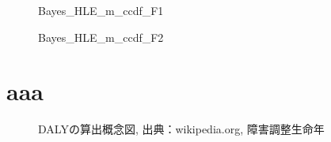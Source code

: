 \documentclass[a4j,11pt,mc, twocolumn]{jreport}
\begin{document}


	\begin{figure}[h!]
		\begin{center}
				\caption{Bayes\_HLE\_m\_ccdf\_F1}
		\end{center}
	\end{figure}



	\begin{figure}[h!]
		\begin{center}
				\caption{Bayes\_HLE\_m\_ccdf\_F2}
		\end{center}
	\end{figure}



	\section{aaa}
	\begin{figure}[h!]
		\begin{center}
				\caption{DALYの算出概念図, 出典：wikipedia.org, 障害調整生命年
			}
		\end{center}
	\end{figure}
\end{document}
